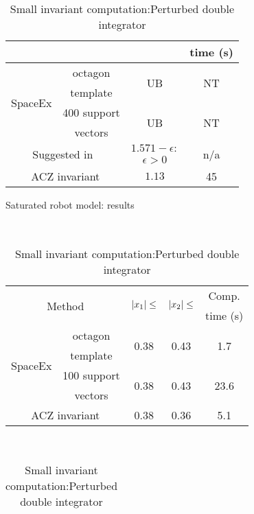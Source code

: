 \begin{table}
\begin{minipage}{0.48\textwidth}
\begin{tabular}{|l|c|c|c|}
\multicolumn{2}{|c|}{} & & time (s)\\
\hline
\multirow{4}{*}{SpaceEx} & octagon & \multirow{2}{*}{UB} &
\multirow{2}{*}{NT}\\
& template & & \\
\cline{2-4}
& 400 support & \multirow{2}{*}{UB} & \multirow{2}{*}{NT}\\
& vectors & & \\
\hline
\multicolumn{2}{|c|}{\multirow{2}{*}{Suggested in~\cite{heinz2014benchmark}}} &
$1.571-\epsilon:$ & \multirow{2}{*}{n/a}\\
\multicolumn{2}{|c|}{} & $\epsilon>0$ &\\
\hline
\multicolumn{2}{|c|}{\multirow{2}{*}{ACZ invariant}} & \multirow{2}{*}{$1.13$} &
\multirow{2}{*}{45}\\
\multicolumn{2}{|c|}{} & &\\
\hline
\end{tabular}
\caption{Saturated robot model: results}
~\label{tab:robot-saturated}
\vspace{-1.5em}
\end{minipage}
\begin{minipage}{0.45\textwidth}
\begin{tabular}{|l|c|c|c|c|}
\hline
\multicolumn{2}{|c|}{\multirow{2}{*}{Method}} &
\multirow{2}{*}{$\left|x_1\right|\leq$} & \multirow{2}{*}{$\left|x_2\right|\leq$} & Comp.\\
\multicolumn{2}{|c|}{} & & & time (s) \\
\hline
\multirow{4}{*}{SpaceEx} & octagon & \multirow{2}{*}{0.38} &
\multirow{2}{*}{0.43} & \multirow{2}{*}{1.7}\\
& template & & &\\
\cline{2-5}
& 100 support & \multirow{2}{*}{0.38} & \multirow{2}{*}{0.43} & \multirow{2}{*}{23.6}\\
& vectors & & &\\
\hline
\multicolumn{2}{|c|}{\multirow{2}{*}{ACZ invariant}} &
\multirow{2}{*}{0.38} & \multirow{2}{*}{0.36} & 
\multirow{2}{*}{5.1}\\
\multicolumn{2}{|c|}{} & & &\\
\hline
\end{tabular}
\caption{Small invariant computation:\newline Perturbed double
  integrator}
~\label{tab:smallinv-pdi}
\end{minipage}
\hspace{4em}
\begin{minipage}{0.4\textwidth}
\begin{tabular}{|c|c|}

\end{tabular}
\end{minipage}
\end{table}
